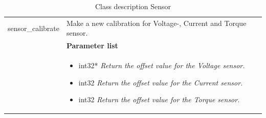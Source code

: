 \begin{table}[H]
\begin{tabular}{|p{5 cm}|p{10 cm}|}
			sensor\_calibrate
			& Make a new calibration for Voltage-, Current and Torque sensor.    
			\\ & \textbf{Parameter list}
			\\ & \begin{itemize}
				\item {\large int32*}
				\subitem \textit{Return the offset value for the Voltage sensor.}
				\item {\large int32}
				\subitem \textit{Return the offset value for the Current sensor.}
				\item {\large int32}
				\subitem \textit{Return the offset value for the Torque sensor.}
			\end{itemize}
			\\ \hline
			
		\end{tabular}
		\caption{Class description Sensor}
		\label{table:Class_description_Sensor_RR_PSoC}
		
\end{table}




